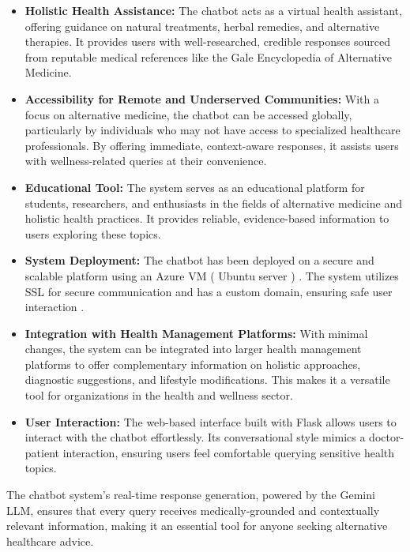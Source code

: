 \documentclass[12pt,a4paper]{report}
\begin{document}
\begin{itemize}
    \item \textbf{Holistic Health Assistance:} The chatbot acts as a virtual health assistant, offering guidance on natural treatments, herbal remedies, and alternative therapies. It provides users with well-researched, credible responses sourced from reputable medical references like the Gale Encyclopedia of Alternative Medicine.
    
    \item \textbf{Accessibility for Remote and Underserved Communities:} With a focus on alternative medicine, the chatbot can be accessed globally, particularly by individuals who may not have access to specialized healthcare professionals. By offering immediate, context-aware responses, it assists users with wellness-related queries at their convenience.
    
    \item \textbf{Educational Tool:} The system serves as an educational platform for students, researchers, and enthusiasts in the fields of alternative medicine and holistic health practices. It provides reliable, evidence-based information to users exploring these topics.
    
    \item \textbf{System Deployment:} The chatbot has been deployed on a secure and scalable platform using an Azure VM ( Ubuntu server ) \cite{azure_docs}. The system utilizes SSL for secure communication and has a custom domain, ensuring safe user interaction \cite{mozilla_ssl}.
    
    \item \textbf{Integration with Health Management Platforms:} With minimal changes, the system can be integrated into larger health management platforms to offer complementary information on holistic approaches, diagnostic suggestions, and lifestyle modifications. This makes it a versatile tool for organizations in the health and wellness sector.
    
    \item \textbf{User Interaction:} The web-based interface built with Flask allows users to interact with the chatbot effortlessly. Its conversational style mimics a doctor-patient interaction, ensuring users feel comfortable querying sensitive health topics.
\end{itemize}

The chatbot system's real-time response generation, powered by the Gemini LLM, ensures that every query receives medically-grounded and contextually relevant information, making it an essential tool for anyone seeking alternative healthcare advice.
\end{document}
